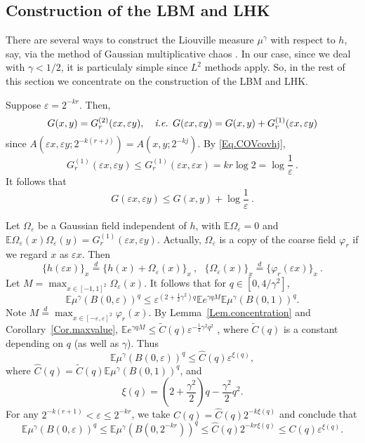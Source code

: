\documentclass[11pt]{article}
\theoremstyle{definition}
\def \e {\varepsilon}
\def \E {{\mathbb{E}}}
\begin{document}
\subsection{Construction of the LBM and LHK} \label{Section.LBM}

There are several ways to construct the Liouville measure $\mu^\gamma$ with respect to $h$, say, via the method of Gaussian multiplicative chaos \cite{Kahane85}. In our case, since we deal with $\gamma<1/2$, it is particulaly simple since $L^2$ methods apply. So, in the rest of this section we concentrate on the construction of the LBM and LHK.

Suppose $\e = 2^{-k r}$. Then,
 \begin{equation} \label{Eq.selfsym}
G(x,y) = G_r^{(2)} (\e x, \e y), \ \ \  \mbox{\em i.e. } G(\e x, \e y)  = G(x,y) + G_r^{(1)} (\e x, \e y)
 \end{equation}
since $A(\e x, \e y; 2^{- k (r+ j)}) = A (x, y ; 2^{- k j})$. By \eqref{Eq.COVcovhj},
 $$
G_r^{(1)} (\e x, \e y) \le G_r^{(1)} (\e x, \e x) = k r \log 2 = \log \frac 1 \e \ .
 $$
It follows that
 \begin{equation} \label{Eq.COVepsiloncov}
G(\e x, \e y) \le G(x,y)  + \log \frac 1 \e \ .
 \end{equation}

Let $\Omega_\e$ be a Gaussian field independent of $h$, with $\E \Omega_\e = 0$ and $\E \Omega_\e (x) \Omega_\e (y) = G_r^{(1)} (\e x, \e y)$. Actually, $\Omega_\e$ is a copy of the coarse field $\varphi_r$ if we regard $x$ as $\e x$.
Then
 $$
\{ h (\e x) \}_x \stackrel d = \{ h (x) + \Omega_\e (x) \}_x \ , \ \ \  \{ \Omega_\e (x) \}_x \stackrel d = \{ \varphi_r (\e x) \}_x \ .
 $$
Let $M = \max_{x \in [-1,1]^2} \Omega_\e (x)$. It follows that for $q \in [0, 4 / \gamma^2]$,
 $$
\E \mu^\gamma (B(0,\e))^q \le \e^{(2 + \frac 1 2 \gamma^2) q} \E e^{\gamma q M} \E \mu^\gamma (B(0,1))^q .
 $$
Note $M \stackrel d = \max_{x \in [-\e, \e]^2 } \varphi_r (x)$. By Lemma~\ref{Lem.concentration} and Corollary~\ref{Cor.maxvalue},  $\E e^{\gamma q M} \le \tilde C (q) \e^{ - \frac 1 2 \gamma^2 q^2}$ , where $\tilde C (q)$ is a constant depending on $q$ (as well as $\gamma$).  Thus
 $$
\E \mu^\gamma (B(0,\e))^q \le \hat C(q) \e^{\xi (q)} ,
 $$
where $\hat C (q) = \tilde C (q) \E \mu^\gamma (B(0,1))^q$, and
 $$
\xi (q) = (2 + \frac {\gamma^2} 2) q - \frac {\gamma^2} 2 q^2 .
 $$
For any $2^{-k (r + 1)} < \e \le 2^{-k r}$, we take $C(q) = \hat C(q) 2^{- k \xi (q)}$ and conclude that
 \begin{equation} \label{Eq.COVpowelaw}
\E  \mu^\gamma (B(0,\e))^q \le \E  \mu^\gamma (B(0, 2^{-kr}))^q  \le \hat C (q)  2^{- k r \xi (q)} \le C(q) \e^{\xi (q)} .
 \end{equation}
\end{document}
